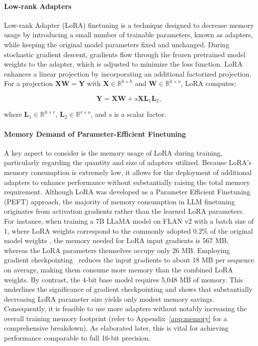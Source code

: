 \paragraph{Low-rank Adapters} Low-rank Adapter (LoRA) finetuning \citep{hu2021lora} is a technique designed to decrease memory usage by introducing a small number of trainable parameters, known as adapters, while keeping the original model parameters fixed and unchanged. During stochastic gradient descent, gradients flow through the frozen pretrained model weights to the adapter, which is adjusted to minimize the loss function. LoRA enhances a linear projection by incorporating an additional factorized projection. For a projection ${\mathbf{X} \mathbf{W} = \mathbf{Y}}$ with $\mathbf{X}\in  \mathbb{R}^{b\times h}$ and $\mathbf{W}\in  \mathbb{R}^{h\times o}$, LoRA computes:

\begin{equation}
    \mathbf{Y} = \mathbf{X}\mathbf{W} + s\mathbf{X}\mathbf{L}_1\mathbf{L}_2,
\end{equation}

where $\mathbf{L}_1\in  \mathbb{R}^{h\times r}$, $\mathbf{L}_2\in  \mathbb{R}^{r\times o}$, and $s$ is a scalar factor.

\paragraph{Memory Demand of Parameter-Efficient Finetuning} A key aspect to consider is the memory usage of LoRA during training, particularly regarding the quantity and size of adapters utilized. Because LoRA’s memory consumption is extremely low, it allows for the deployment of additional adapters to enhance performance without substantially raising the total memory requirement. Although LoRA was developed as a Parameter Efficient Finetuning (PEFT) approach, the majority of memory consumption in LLM finetuning originates from activation gradients rather than the learned LoRA parameters. For instance, when training a 7B LLaMA model on FLAN v2 with a batch size of 1, where LoRA weights correspond to the commonly adopted 0.2\% of the original model weights \citep{hu2021lora,liu2022few}, the memory needed for LoRA input gradients is 567 MB, whereas the LoRA parameters themselves occupy only 26 MB. Employing gradient checkpointing~\citep{chen2016training} reduces the input gradients to about 18 MB per sequence on average, making them consume more memory than the combined LoRA weights. By contrast, the 4-bit base model requires 5,048 MB of memory. This underlines the significance of gradient checkpointing and shows that substantially decreasing LoRA parameter size yields only modest memory savings. Consequently, it is feasible to use more adapters without notably increasing the overall training memory footprint (refer to Appendix~\ref{app:memory} for a comprehensive breakdown). As elaborated later, this is vital for achieving performance comparable to full 16-bit precision.


